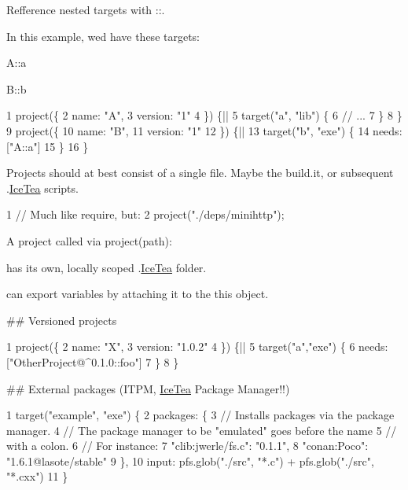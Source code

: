 \begin{DoxyItemize}
\item Refference nested targets with {\ttfamily \+:\+:}.
\begin{DoxyItemize}
\item In this example, we\textquotesingle{}d have these targets\+:
\begin{DoxyItemize}
\item {\ttfamily A\+::a}
\item {\ttfamily B\+::b} 
\begin{DoxyCode}
1 project(\{
2     name: "A",
3     version: "1"
4 \}) \{||
5     target("a", "lib") \{
6         // ...
7     \}
8 \}
9 project(\{
10     name: "B",
11     version: "1"
12 \}) \{||
13     target("b", "exe") \{
14         needs: ["A::a"]
15     \}
16 \}
\end{DoxyCode}

\end{DoxyItemize}
\end{DoxyItemize}
\item Projects should at best consist of a single file. Maybe the {\ttfamily build.\+it}, or subsequent {\ttfamily .\hyperlink{class_ice_tea}{Ice\+Tea}} scripts. 
\begin{DoxyCode}
1 // Much like require, but:
2 project("./deps/minihttp");
\end{DoxyCode}

\item A project called via {\ttfamily project(path)}\+:
\begin{DoxyItemize}
\item has it\textquotesingle{}s own, locally scoped {\ttfamily .\hyperlink{class_ice_tea}{Ice\+Tea}} folder.
\item can export variables by attaching it to the {\ttfamily this} object.
\end{DoxyItemize}
\end{DoxyItemize}

\#\# Versioned projects 
\begin{DoxyCode}
1 project(\{
2     name: "X",
3     version: "1.0.2"
4 \}) \{||
5     target("a","exe") \{
6         needs: ["OtherProject@^0.1.0::foo"]
7     \}
8 \}
\end{DoxyCode}


\#\# External packages (I\+T\+PM, \hyperlink{class_ice_tea}{Ice\+Tea} Package Manager!!) 
\begin{DoxyCode}
1 target("example", "exe") \{
2     packages: \{
3         // Installs packages via the package manager.
4         // The package manager to be "emulated" goes before the name
5         // with a colon.
6         // For instance:
7         "clib:jwerle/fs.c": "0.1.1",
8         "conan:Poco": "1.6.1@lasote/stable"
9     \},
10     input: pfs.glob("./src", "*.c") + pfs.glob("./src", "*.cxx")
11 \}
\end{DoxyCode}


